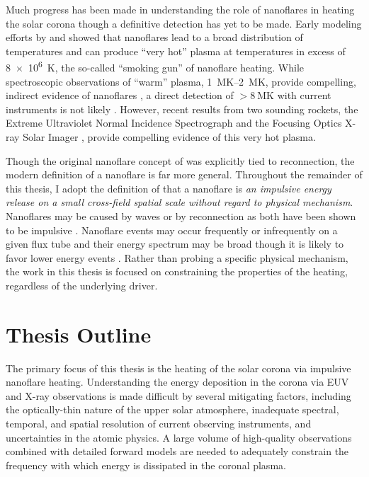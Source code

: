Much progress has been made in understanding the role of nanoflares in heating the solar corona though a definitive detection has yet to be made. Early modeling efforts by \citet{cargill_implications_1994} and \citet{cargill_nanoflare_2004} showed that nanoflares lead to a broad distribution of temperatures and can produce ``very hot'' plasma at temperatures in excess of \SI{8e6}{\kelvin}, the so-called ``smoking gun'' of nanoflare heating. While spectroscopic observations of ``warm'' plasma, \SIrange{1}{2}{\mega\kelvin}, provide compelling, indirect evidence of nanoflares \citep[e.g.]{warren_constraints_2011,warren_systematic_2012,viall_evidence_2012}, a direct detection of $>\SI{8}{\mega\kelvin}$ with current instruments is not likely \citet{winebarger_defining_2012}. However, recent results from two sounding rockets, the Extreme Ultraviolet Normal Incidence Spectrograph \citep[EUNIS,][]{brosius_pervasive_2014} and the Focusing Optics X-ray Solar Imager \citep[FOXSI,][]{ishikawa_detection_2017}, provide compelling evidence of this very hot plasma.

Though the original nanoflare concept of \citet{parker_nanoflares_1988} was explicitly tied to reconnection, the modern definition of a nanoflare is far more general. Throughout the remainder of this thesis, I adopt the definition of \citet{klimchuk_key_2015} that a nanoflare is \textit{an impulsive energy release on a small cross-field spatial scale without regard to physical mechanism}. Nanoflares may be caused by waves or by reconnection as both have been shown to be impulsive \citep{klimchuk_solving_2006,klimchuk_key_2015}. Nanoflare events may occur frequently or infrequently on a given flux tube and their energy spectrum may be broad though it is likely to favor lower energy events \citep{hudson_solar_1991}. Rather than probing a specific physical mechanism, the work in this thesis is focused on constraining the properties of the heating, regardless of the underlying driver.

\section{Thesis Outline}\label{sec:outline}

The primary focus of this thesis is the heating of the solar corona via impulsive nanoflare heating. Understanding the energy deposition in the corona via EUV and X-ray observations is made difficult by several mitigating factors, including the optically-thin nature of the upper solar atmosphere, inadequate spectral, temporal, and spatial resolution of current observing instruments, and uncertainties in the atomic physics. A large volume of high-quality observations combined with detailed forward models are needed to adequately constrain the frequency with which energy is dissipated in the coronal plasma.

